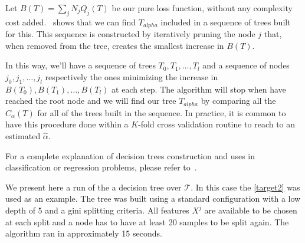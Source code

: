Let $B(T) = \sum_{j} N_j Q_j(T) $ be our pure loss function, without any complexity cost added.~\textcite{breiman-cart84} shows that we can find $T_{alpha}$ included in a sequence of trees built for this. This sequence is constructed by iteratively pruning the node $j$ that, when removed from the tree, creates the smallest increase in $B(T)$.




In this way, we'll have a sequence of trees $T_0,T_1,\ldots,T_l$ and a sequence of nodes $j_0, j_1,\ldots,j_l$ respectively the ones minimizing the increase in $B(T_0),B(T_1),\ldots,B(T_l)$ at each step. The algorithm will stop when have reached the root node and we will find our tree $T_{alpha}$ by comparing all the $C_\alpha(T)$ for all of the trees built in the sequence. In practice, it is common to have this procedure done within a $K$-fold cross validation routine to reach to an estimated $\hat{\alpha}$.

For a complete explanation of decision trees construction and uses in classification or regression problems, please refer to~\textcite{breiman-cart84}.

We present here a run of the a decision tree over $\mathcal{T}$.
In this case the \cref{target2} was used as an example.
The tree was built using a standard configuration with a low depth of 5 and a gini splitting criteria.
All features $X^j$ are available to be chosen at each split and a node has to have at least 20 samples to be split again. The algorithm ran in approximately 15 seconds.


